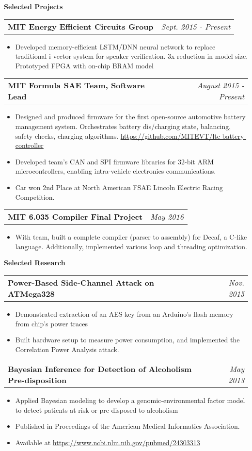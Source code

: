 \documentclass[letterpaper,11pt]{article}
\makeatletter
\newcommand{\resitem}[1]{\item[--] #1 \vspace{-4pt}}
\newcommand{\ressubheadingtwo}[2] {
\begin{tabular*}{7in}{l@{\extracolsep{\fill}}r}
	\textbf{#1} & \textit{#2} \\
\end{tabular*}\vspace{-6pt}}
\makeatother
\begin{document}
    \vspace{0.05in}

\large \textbf{Selected Projects\vspace{3mm}} \normalsize
    \vspace{0.05in}

	\ressubheadingtwo{MIT Energy Efficient Circuits Group}{Sept. 2015 - Present}{}
	\begin{itemize}
            \resitem{Developed memory-efficient LSTM/DNN neural network to replace traditional i-vector system for speaker verification. 3x reduction in model size. Prototyped FPGA with on-chip BRAM model}
	\end{itemize}

    \vspace{0.05in}
	\ressubheadingtwo{MIT Formula SAE Team, Software Lead}{August 2015 - Present}
	\begin{itemize}
            \resitem{Designed and produced firmware for the first open-source automotive battery management system. Orchestrates battery dis/charging state, balancing, safety checks, charging algorithms. \url{https://github.com/MITEVT/ltc-battery-controller}}
		\resitem{Developed team's CAN and SPI firmware libraries for 32-bit ARM microcontrollers, enabling intra-vehicle electronics communications.}
        \resitem{Car won 2nd Place at North American FSAE Lincoln Electric Racing Competition.}
	\end{itemize}

    \vspace{0.05in}
	\ressubheadingtwo{MIT 6.035 Compiler Final Project}{May 2016}
	\begin{itemize}
            \resitem{With team, built a complete compiler (parser to assembly) for Decaf, a C-like language. Additionally, implemented various loop and threading optimization.}
	\end{itemize}

    \vspace{0.05in}

\large \textbf{Selected Research \vspace{3mm}} \normalsize
    \ressubheadingtwo{Power-Based Side-Channel Attack on ATMega328}{Nov. 2015}{}
	\begin{itemize}
            \resitem{Demonstrated extraction of an AES key from an Arduino's flash memory from chip's power traces}
            \resitem{Built hardware setup to measure power consumption, and implemented the Correlation Power Analysis attack.}
	\end{itemize}
    \vspace{0.2in}
    \ressubheadingtwo{Bayesian Inference for Detection of Alcoholism Pre-disposition}{May 2013}{}
	\begin{itemize}
            \resitem{Applied Bayesian modeling to develop a genomic-environmental factor model to detect patients at-risk or pre-disposed to alcoholism}
            \resitem{Published in Proceedings of the American Medical Informatics Association.}
            \resitem{Available at \url{https://www.ncbi.nlm.nih.gov/pubmed/24303313}}
	\end{itemize}
\end{document}
